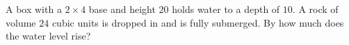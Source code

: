 A box with a $2\times4$ base and height $20$ holds water to a depth of $10$. A rock of volume $24$ cubic units is dropped in and is fully submerged. By how much does the water level rise?
